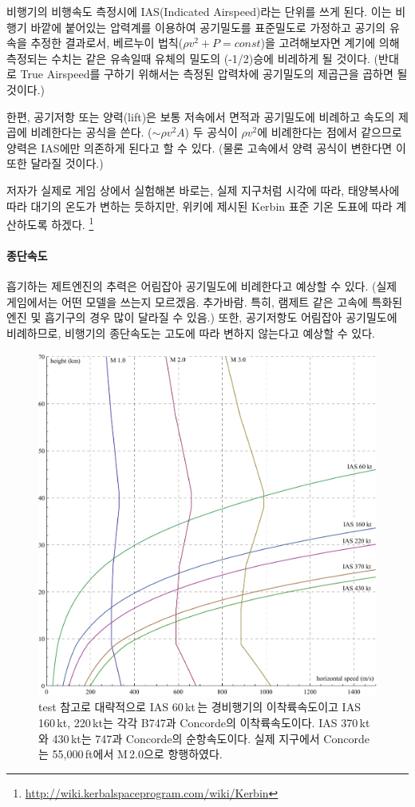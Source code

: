 \documentclass[9pt,twoside,openany]{amsbook}
\begin{document}
비행기의 비행속도 측정시에 IAS(Indicated Airspeed)라는 단위를 쓰게 된다. 
이는 비행기 바깥에 붙어있는 압력계를 이용하여 공기밀도를 표준밀도로 가정하고 공기의 유속을 추정한 결과로서, 베르누이 법칙($\rho v^2 + P = const$)을 고려해보자면 계기에 의해 측정되는 수치는 같은 유속일때 유체의 밀도의 (-1/2)승에 비레하게 될 것이다. (반대로 True Airspeed를 구하기 위해서는 측정된 압력차에 공기밀도의 제곱근을 곱하면 될 것이다.)

한편, 공기저항 또는 양력(lift)은 보통 저속에서 면적과 공기밀도에 비례하고 속도의 제곱에 비례한다는 공식을 쓴다. ($\sim \rho v^2 A$)
두 공식이 $\rho v^2$에 비례한다는 점에서 같으므로 양력은 IAS에만 의존하게 된다고 할 수 있다. (물론 고속에서 양력 공식이 변한다면 이 또한 달라질 것이다.)

저자가 실제로 게임 상에서 실험해본 바로는, 실제 지구처럼 시각에 따라, 태양복사에 따라 대기의 온도가 변하는 듯하지만, 위키에 제시된 Kerbin 표준 기온 도표에 따라 계산하도록 하겠다. \footnote{\url{http://wiki.kerbalspaceprogram.com/wiki/Kerbin}}

\paragraph{종단속도}
흡기하는 제트엔진의 추력은 어림잡아 공기밀도에 비례한다고 예상할 수 있다. (실제 게임에서는 어떤 모델을 쓰는지 모르겠음. 추가바람. 특히, 램제트 같은 고속에 특화된 엔진 및 흡기구의 경우 많이 달라질 수 있음.) 또한, 공기저항도 어림잡아 공기밀도에 비례하므로, 비행기의 종단속도는 고도에 따라 변하지 않는다고 예상할 수 있다.
\begin{figure}
\includegraphics[width=\textwidth]{ias.pdf}
\caption{test 참고로 대략적으로 IAS 60\,kt\,는 경비행기의 이착륙속도이고 IAS 160\,kt, 220\,kt는 각각 B747과 Concorde의 이착륙속도이다. IAS 370\,kt와 430\,kt는 747과 Concorde의 순항속도이다. 실제 지구에서 Concorde는 55,000\,ft에서 M\,2.0으로 항행하였다.}
\end{figure}
\end{document}
